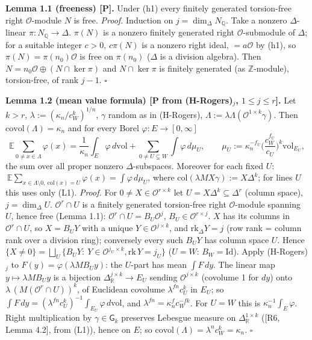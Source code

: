 \textbf{Lemma 1.1 (freeness) {[}P{]}.} Under (h1) every finitely generated torsion-free right \(\mathcal O\)-module \(N\) is free.
\emph{Proof.} Induction on \(j=\dim_\Delta N_{\mathbb Q}\). Take a nonzero \(\Delta\)-linear \(\pi:N_{\mathbb Q}\to\Delta\). \(\pi(N)\) is a nonzero finitely generated right \(\mathcal O\)-submodule of \(\Delta\); for a suitable integer \(c>0\), \(c\pi(N)\) is a nonzero right ideal, \(=a\mathcal O\) by (h1), so \(\pi(N)=\pi(n_0)\mathcal O\) is free on \(\pi(n_0)\) (\(\Delta\) is a division algebra). Then \(N=n_0\mathcal O\oplus(N\cap\ker\pi)\) and \(N\cap\ker\pi\) is finitely generated (as \(\mathbb Z\)-module), torsion-free, of rank \(j-1\). \(\square\)

\textbf{Lemma 1.2 (mean value formula) {[}P from (H-Rogers)\(_j\), \(1\le j\le r\){]}.} Let \(k>r\), \(\lambda:=(\kappa_n/c_W^k)^{1/n}\), \(\gamma\) random as in (H-Rogers), \(\Lambda:=\lambda\Lambda(\mathcal O^{1\times k}\gamma)\). Then \(\mathrm{covol}(\Lambda)=\kappa_n\) and for every Borel \(\varphi:E\to[0,\infty]\)
\[\mathbb E\sum_{0\ne x\in\Lambda}\varphi(x)=\frac1{\kappa_n}\int_E\varphi\,d\mathrm{vol}+\sum_{0\ne U\subsetneq W}\int\varphi\,d\mu_U,\qquad \mu_U:=\kappa_n^{-f_U}\Big(\frac{c_W^{f_U}}{c_U}\Big)^{k}\mathrm{vol}_{E_U},\tag{MVF}\]
the sum over all proper nonzero \(\Delta\)-subspaces. Moreover for each fixed \(U\): \(\ \mathbb E\sum_{x\in\Lambda\setminus0,\ \mathrm{col}(x)= U}\varphi(x)=\int\varphi\,d\mu_U\), where \(\mathrm{col}(\lambda MX\gamma):=X\Delta^k\); for lines \(U\) this uses only (L1).
\emph{Proof.} For \(0\ne X\in\mathcal O^{r\times k}\) let \(U=X\Delta^k\subseteq\Delta^r\) (column space), \(j=\dim_\Delta U\). \(\mathcal O^r\cap U\) is a finitely generated torsion-free right \(\mathcal O\)-module spanning \(U\), hence free (Lemma 1.1): \(\mathcal O^r\cap U=B_U\mathcal O^j\), \(B_U\in\mathcal O^{r\times j}\). \(X\) has its columns in \(\mathcal O^r\cap U\), so \(X=B_UY\) with a unique \(Y\in\mathcal O^{j\times k}\), and \(\mathrm{rk}_\Delta Y=j\) (row rank = column rank over a division ring); conversely every such \(B_UY\) has column space \(U\). Hence \(\{X\ne0\}=\bigsqcup_U\{B_UY:\ Y\in\mathcal O^{j_U\times k},\mathrm{rk}\,Y=j_U\}\) (\(U=W\): \(B_W=\mathrm{Id}\)). Apply (H-Rogers)\(_j\) to \(F(y)=\varphi(\lambda MB_Uy)\): the \(U\)-part has mean \(\int F\,dy\). The linear map \(y\mapsto\lambda MB_Uy\) is a bijection \(\Delta_{\mathbb R}^{j\times k}\to E_U\) sending \(\mathcal O^{j\times k}\) (covolume 1 for \(dy\)) onto \(\lambda\,(M(\mathcal O^r\cap U))^k\), of Euclidean covolume \(\lambda^{fn}c_U^k\) in \(E_U\); so \(\int F\,dy=(\lambda^{fn}c_U^k)^{-1}\int_{E_U}\varphi\,d\mathrm{vol}\), and \(\lambda^{fn}=\kappa_n^fc_W^{-fk}\). For \(U=W\) this is \(\kappa_n^{-1}\int_E\varphi\). Right multiplication by \(\gamma\in\mathsf G_k\) preserves Lebesgue measure on \(\Delta_{\mathbb R}^{1\times k}\) ({[}R6, Lemma 4.2{]}, from (L1)), hence on \(E\); so \(\mathrm{covol}(\Lambda)=\lambda^nc_W^k=\kappa_n\). \(\square\)

